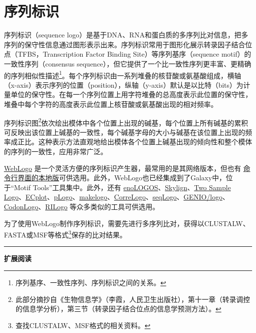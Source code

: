 \documentclass[11pt,a4paper,twoside]{book}
\begin{document}
\section{序列标识}
序列标识（sequence logo）是基于DNA、RNA和蛋白质的多序列比对信息，把多序列的保守性信息通过图形表示出来。序列标识常用于图形化展示转录因子结合位点（TFBS，Transcription Factor Binding Site）等序列基序（sequence motif）的一致性序列（consensus sequence），但它提供了一个比一致性序列更丰富、更精确的序列相似性描述\footnote{序列基序、一致性序列、序列标识之间的关系。}。每个序列标识由一系列堆叠的核苷酸或氨基酸组成，横轴（x-axis）表示序列的位置（position），纵轴（y-axis）默认是以比特（bits）为计量单位的保守性。在每一个序列位置上用字符堆叠的总高度表示此位置的保守性，堆叠中每个字符的高度表示此位置上核苷酸或氨基酸出现的相对频率。

序列标识图\footnote{此部分摘抄自《生物信息学》（李霞，人民卫生出版社），第十一章（转录调控的信息学分析），第三节（转录因子结合位点的信息学预测方法）。}依次绘出模体中各个位置上出现的碱基，每个位置上所有碱基的累积可反映出该位置上碱基的一致性，每个碱基字母的大小与碱基在该位置上出现的频率成正比。这种表示方法直观地给出模体各个位置上碱基出现的倾向性和整个模体的序列的一致性，应用非常广泛。

\href{http://weblogo.threepluson.com}{WebLogo} 是一个灵活方便的序列标识产生器，最常用的是其网络版本，但也有 \href{http://code.google.com/p/weblogo/}{命令行界面的本地版}可供选用。此外，WebLogo也已经集成到了Galaxy中，位于“Motif Tools”工具集中。此外，还有 \href{http://www.benoslab.pitt.edu/cgi-bin/enologos/enologos.cgi}{enoLOGOS}、\href{http://skylign.org/}{Skylign}、\href{http://www.twosamplelogo.org/}{Two Sample Logo}、\href{https://yiplab.cse.cuhk.edu.hk/ecplot/}{ECplot}、\href{https://plogo.uconn.edu/}{pLogo}、\href{http://schneider.ncifcrf.gov/delila/makelogo.html}{makelogo}、\href{http://www.ccrnp.ncifcrf.gov/users/bshapiro/webserver\_index.html}{CorreLogo}、\href{http://bioconductor.org/packages/release/bioc/html/seqLogo.html}{seqLogo}、\href{http://www.biogenio.com/logo/logo.cgi}{GENIO/logo}、\href{http://recode.ucc.ie/CodonLogo/}{CodonLogo}、\href{http://rth.dk/resources/rilogo/}{RILogo} 等众多类似的工具可供选用。 

为了使用WebLogo制作序列标识，需要先进行多序列比对，获得以CLUSTALW、FASTA或MSF等格式\footnote{查找CLUSTALW、MSF格式的相关资料。}保存的比对结果。
\vspace{0.5cm}
\hrule height 3pt

\noindent
{\large \bfseries \HandPencilLeft 扩展阅读}
\end{document}
